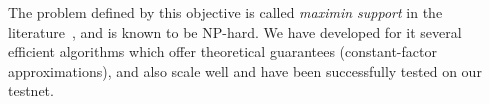 The problem defined by this objective is called \emph{maximin support} in the literature~\cite{sanchez2016maximin}, and is known to be NP-hard.
We have developed for it several efficient algorithms which offer theoretical guarantees 
(constant-factor approximations), and also scale well and have been successfully tested on our testnet. 
